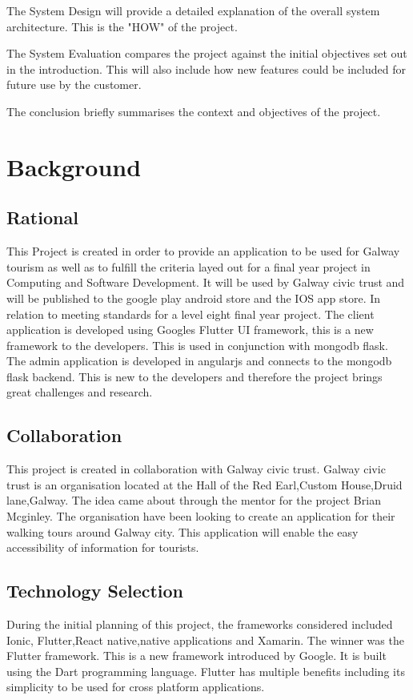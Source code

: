 The System Design will provide a detailed explanation of the overall system architecture. This is the "HOW" of the project.

The System Evaluation compares the project against the initial objectives set out in the introduction. This will also include how new features could be included for future use by the customer.

The conclusion briefly summarises the context and objectives of the project.

\chapter{Background}
\section{Rational}
This Project is created in order to provide an application to be used for Galway tourism as well as to fulfill the criteria layed out for a final year project in Computing and Software Development. It will be used by Galway civic trust and will be published to the google play android store and the IOS app store. In relation to meeting standards for a level eight final year project. The client application is developed using Googles Flutter UI framework, this is a new framework to the developers. This is used in conjunction with mongodb flask. The admin application is developed in angularjs and connects to the mongodb flask backend. This is new to the developers and therefore the project brings great challenges and research.

\section{Collaboration}
This project is created in collaboration with Galway civic trust. Galway civic trust is an organisation located at the Hall of the Red Earl,Custom House,Druid lane,Galway. The idea came about through the mentor for the project Brian Mcginley. The organisation have been looking to create an application for their walking tours around Galway city. This application will enable the easy accessibility of information for tourists. 

\section{Technology Selection}
During the initial planning of this project, the frameworks considered included Ionic, Flutter,React native,native applications and Xamarin. The winner was the Flutter framework. This is a new framework introduced by Google. It is built using the Dart programming language. Flutter has multiple benefits including its simplicity to be used for cross platform applications.


